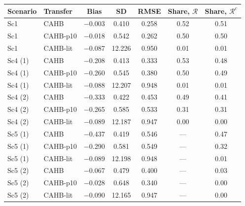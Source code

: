 \begin{center}\scriptsize
\begin{tabular}{llccccc}
\toprule
Scenario & Transfer & Bias & SD & RMSE & Share, $\mathcal R$ & Share, $\mathcal R^c$ \\
\midrule
Sc1 & CAHB & $-$0.003 & 0.410 & 0.258 & 0.52 & 0.51 \\
Sc1 & CAHB-p10 & $-$0.018 & 0.542 & 0.262 & 0.50 & 0.50 \\
Sc1 & CAHB-lit & $-$0.087 & 12.226 & 0.950 & 0.01 & 0.01 \\
Sc4 (1) & CAHB & $-$0.208 & 0.413 & 0.333 & 0.53 & 0.48 \\
Sc4 (1) & CAHB-p10 & $-$0.260 & 0.545 & 0.380 & 0.50 & 0.49 \\
Sc4 (1) & CAHB-lit & $-$0.088 & 12.207 & 0.948 & 0.01 & 0.01 \\
Sc4 (2) & CAHB & $-$0.333 & 0.422 & 0.453 & 0.49 & 0.41 \\
Sc4 (2) & CAHB-p10 & $-$0.265 & 0.585 & 0.533 & 0.31 & 0.31 \\
Sc4 (2) & CAHB-lit & $-$0.089 & 12.187 & 0.947 & 0.00 & 0.00 \\
Sc5 (1) & CAHB & $-$0.437 & 0.419 & 0.546 & --- & 0.47 \\
Sc5 (1) & CAHB-p10 & $-$0.290 & 0.581 & 0.549 & --- & 0.32 \\
Sc5 (1) & CAHB-lit & $-$0.089 & 12.198 & 0.948 & --- & 0.01 \\
Sc5 (2) & CAHB & $-$0.067 & 0.479 & 0.400 & --- & 0.03 \\
Sc5 (2) & CAHB-p10 & $-$0.028 & 0.648 & 0.340 & --- & 0.00 \\
Sc5 (2) & CAHB-lit & $-$0.090 & 12.165 & 0.947 & --- & 0.00 \\
\bottomrule
\end{tabular}
\end{center}
